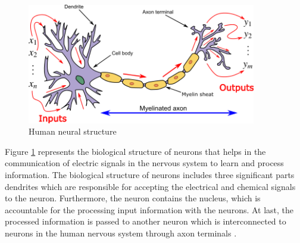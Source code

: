 \begin{figure}[!htp]
    \centering
    \includegraphics[width=10cm]{Images/neuron.png}
    \caption{Human neural structure}
    \label{figure:neuralStructure}
\end{figure}

Figure \ref{figure:neuralStructure} represents the biological structure of neurons that helps in the communication of electric signals in the nervous system to learn and process information. The biological structure of neurons includes three significant parts dendrites which are responsible for accepting the electrical and chemical signals to the neuron. Furthermore, the neuron contains the nucleus, which is accountable for the processing input information with the neurons. At last, the processed information is passed to another neuron which is interconnected to neurons in the human nervous system through axon terminals
\citep{AGATONOVICKUSTRIN2000717}. 
